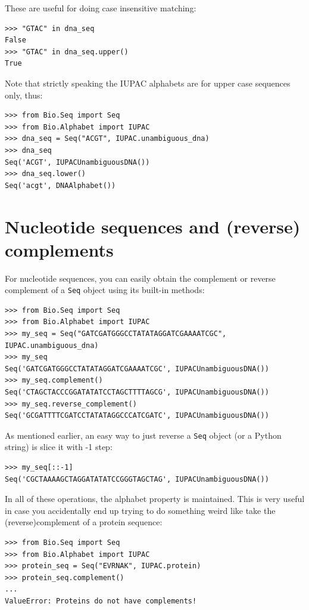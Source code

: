 \documentclass{report}
\begin{document}
These are useful for doing case insensitive matching:

\begin{verbatim}
>>> "GTAC" in dna_seq
False
>>> "GTAC" in dna_seq.upper()
True
\end{verbatim}

Note that strictly speaking the IUPAC alphabets are for upper case
sequences only, thus:

\begin{verbatim}
>>> from Bio.Seq import Seq
>>> from Bio.Alphabet import IUPAC
>>> dna_seq = Seq("ACGT", IUPAC.unambiguous_dna)
>>> dna_seq
Seq('ACGT', IUPACUnambiguousDNA())
>>> dna_seq.lower()
Seq('acgt', DNAAlphabet())
\end{verbatim}


\section{Nucleotide sequences and (reverse) complements}
\label{sec:seq-reverse-complement}

For nucleotide sequences, you can easily obtain the complement or reverse
complement of a \verb|Seq| object using its built-in methods:

\begin{verbatim}
>>> from Bio.Seq import Seq
>>> from Bio.Alphabet import IUPAC
>>> my_seq = Seq("GATCGATGGGCCTATATAGGATCGAAAATCGC", IUPAC.unambiguous_dna)
>>> my_seq
Seq('GATCGATGGGCCTATATAGGATCGAAAATCGC', IUPACUnambiguousDNA())
>>> my_seq.complement()
Seq('CTAGCTACCCGGATATATCCTAGCTTTTAGCG', IUPACUnambiguousDNA())
>>> my_seq.reverse_complement()
Seq('GCGATTTTCGATCCTATATAGGCCCATCGATC', IUPACUnambiguousDNA())
\end{verbatim}

As mentioned earlier, an easy way to just reverse a \verb|Seq| object (or a
Python string) is slice it with -1 step:

\begin{verbatim}
>>> my_seq[::-1]
Seq('CGCTAAAAGCTAGGATATATCCGGGTAGCTAG', IUPACUnambiguousDNA())
\end{verbatim}

In all of these operations, the alphabet property is maintained. This is very
useful in case you accidentally end up trying to do something weird like take
the (reverse)complement of a protein sequence:

\begin{verbatim}
>>> from Bio.Seq import Seq
>>> from Bio.Alphabet import IUPAC
>>> protein_seq = Seq("EVRNAK", IUPAC.protein)
>>> protein_seq.complement()
...
ValueError: Proteins do not have complements!
\end{verbatim}
\end{document}
